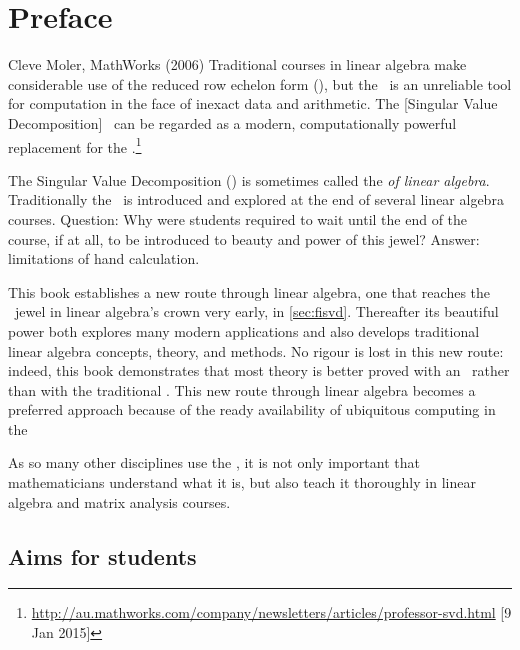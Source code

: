 \tableofcontents


\chapter*{Preface}


\begin{quoted}{Cleve Moler, MathWorks (2006)}
Traditional courses in linear algebra make considerable use of the 
{reduced row echelon form} (\rref), but the \rref\ is an unreliable tool for computation in the face of inexact data and arithmetic. 
The [Singular Value Decomposition] \svd\ can be regarded as a modern, computationally powerful replacement for the \rref.\footnote{\url{http://au.mathworks.com/company/newsletters/articles/professor-svd.html} [9 Jan 2015]}
\end{quoted}

The Singular Value Decomposition (\svd) is sometimes called the \emph{ of linear algebra}.
Traditionally the \svd\ is introduced and explored at the end of several linear algebra courses.
Question: Why were students required to wait until the end of the course, if at all, to be introduced to beauty and power of this jewel?
Answer: limitations of hand calculation.

This book establishes a new route through linear algebra, one that reaches the \svd\ jewel in linear algebra's crown very early, in \cref{sec:fisvd}.
Thereafter its beautiful power both explores many modern applications and also develops traditional linear algebra concepts, theory, and methods.
No rigour is lost in this new route: indeed, this book demonstrates that most theory is better proved with an \svd\ rather than with the traditional \rref.
This new route through linear algebra becomes a preferred approach because of the ready availability of ubiquitous computing in the 


\begin{quoted}{\cite[p.30]{Turner2014}}
As so many other disciplines use the \svd, it is not only important that mathematicians understand what it is, but also teach it thoroughly in linear algebra and matrix analysis courses.
\end{quoted}











\section*{Aims for students}

